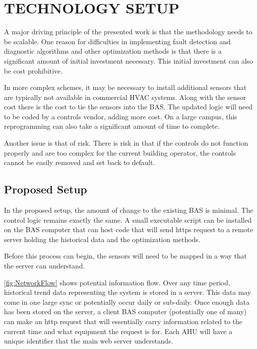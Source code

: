 \chapter{\uppercase{Technology Setup}}

A major driving principle of the presented work is that the methodology
needs to be scalable. One reason for difficulties in implementing fault
detection and diagnostic algorithms and other optimization methods is
that there is a significant amount of initial investment necessary. This
initial investment can also be cost prohibitive. 

In more complex schemes, it may be necessary to install additional
sensors that are typically not available in commercial HVAC systems.
Along with the sensor cost there is the cost to tie the sensors into the
BAS. The updated logic will need to be coded by a controls vendor,
adding more cost. On a large campus, this reprogramming can also take a
significant amount of time to complete. 

Another issue is that of risk. There is risk in that if the controls do
not function properly and are too complex for the current building
operator, the controls cannot be easily removed and set back to default. 

\section{Proposed Setup}

In the proposed setup, the amount of change to the existing BAS is
minimal. The control logic remains exactly the same. A small executable
script can be installed on the BAS computer that can host code that will
send https request to a remote server holding the historical data and
the optimization methods. 

Before this process can begin, the sensors will need to be mapped in a
way that the server can understand. 

\figref{} \ref{fig:NetworkFlow} shows potential information flow. Over
any time period, historical trend data representing the system is stored
in a server. This data may come in one large sync or potentially occur
daily or sub-daily. Once enough data has been stored on the server, a
client BAS computer (potentially one of many) can make an http request
that will essentially carry information related to the current time and
what equipment the request is for. Each AHU will have a unique
identifier that the main web server understands. 

